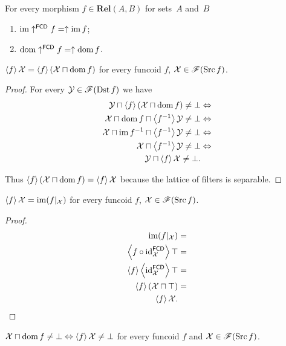 \begin{obvious}
For every morphism $f\in\mathbf{Rel}(A,B)$ for sets~$A$ and~$B$
\begin{enumerate}
\item $\operatorname{im}\uparrow^{\mathsf{FCD}}f=\uparrow\operatorname{im} f$;
\item $\operatorname{dom}\uparrow^{\mathsf{FCD}}f=\uparrow\operatorname{dom} f$.
\end{enumerate}
\end{obvious}
\begin{prop}
$\left\langle f\right\rangle\mathcal{X}=\left\langle f\right\rangle(\mathcal{X}\sqcap\operatorname{dom} f)$ for every
funcoid $f$, $\mathcal{X}\in\mathscr{F}(\operatorname{Src} f)$.\end{prop}
\begin{proof}
For every $\mathcal{Y}\in\mathscr{F}(\operatorname{Dst} f)$ we have
\begin{align*}
\mathcal{Y}\sqcap\left\langle f\right\rangle(\mathcal{X}\sqcap\operatorname{dom} f)\ne\bot
& \Leftrightarrow\\
\mathcal{X}\sqcap\operatorname{dom} f\sqcap\left\langle f^{-1}\right\rangle\mathcal{Y}\ne\bot & \Leftrightarrow\\
\mathcal{X}\sqcap\operatorname{im}
f^{-1}\sqcap\left\langle f^{-1}\right\rangle\mathcal{Y}\ne\bot &
\Leftrightarrow\\
\mathcal{X}\sqcap\left\langle f^{-1}\right\rangle\mathcal{Y}\ne\bot &
\Leftrightarrow\\
\mathcal{Y}\sqcap\left\langle f\right\rangle\mathcal{X}\ne\bot.
\end{align*}


Thus $\left\langle f\right\rangle(\mathcal{X}\sqcap\operatorname{dom} f)=\left\langle f\right\rangle\mathcal{X}$ because
the lattice of filters is separable.\end{proof}
\begin{prop}
$\left\langle f\right\rangle\mathcal{X}=\operatorname{im}(f|_{\mathcal{X}})$ for every funcoid $f$,
$\mathcal{X}\in\mathscr{F}(\operatorname{Src} f)$.\end{prop}
\begin{proof}
~
\begin{align*}
\operatorname{im}(f|_{\mathcal{X}}) & =\\
\left\langle f\circ\operatorname{id}_{\mathcal{X}}^{\mathsf{FCD}}\right\rangle\top & =\\
\left\langle f\right\rangle\left\langle \operatorname{id}_{\mathcal{X}}^{\mathsf{FCD}}\right\rangle\top &
=\\
\left\langle f\right\rangle(\mathcal{X}\sqcap\top) & =\\
\left\langle f\right\rangle\mathcal{X}.
\end{align*}
\end{proof}
\begin{prop}\label{x-dom-fcd}
$\mathcal{X}\sqcap\operatorname{dom} f\ne\bot\Leftrightarrow\left\langle f\right\rangle\mathcal{X}\ne\bot$
for every funcoid $f$ and $\mathcal{X}\in\mathscr{F}(\operatorname{Src} f)$.\end{prop}
